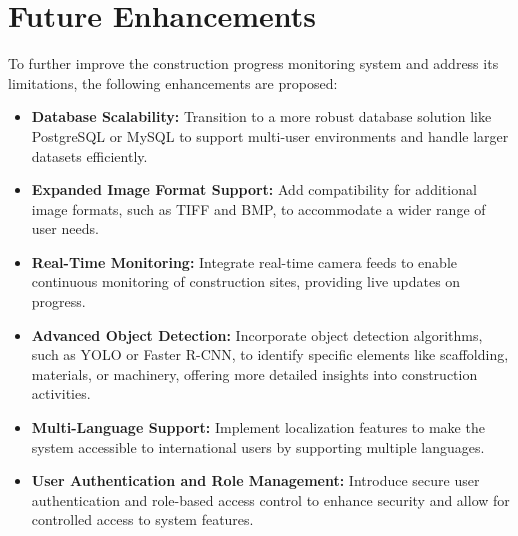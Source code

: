 \documentclass[12pt,a4paper]{report}
\begin{document}
\section{Future Enhancements}
To further improve the construction progress monitoring system and address its limitations, the following enhancements are proposed:
\begin{itemize}
    \item \textbf{Database Scalability:} Transition to a more robust database solution like PostgreSQL or MySQL to support multi-user environments and handle larger datasets efficiently.
    \item \textbf{Expanded Image Format Support:} Add compatibility for additional image formats, such as TIFF and BMP, to accommodate a wider range of user needs.
    \item \textbf{Real-Time Monitoring:} Integrate real-time camera feeds to enable continuous monitoring of construction sites, providing live updates on progress.
    \item \textbf{Advanced Object Detection:} Incorporate object detection algorithms, such as YOLO or Faster R-CNN, to identify specific elements like scaffolding, materials, or machinery, offering more detailed insights into construction activities.
    \item \textbf{Multi-Language Support:} Implement localization features to make the system accessible to international users by supporting multiple languages.
    \item \textbf{User Authentication and Role Management:} Introduce secure user authentication and role-based access control to enhance security and allow for controlled access to system features.
    
    
\end{itemize}

\end{document}
